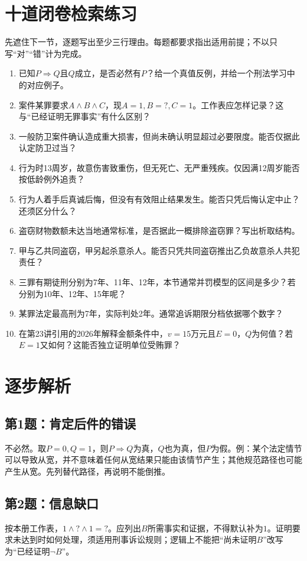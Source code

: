 \section{十道闭卷检索练习}
先遮住下一节，逐题写出至少三行理由。每题都要求指出适用前提；不以只写“对”“错”计为完成。
\begin{enumerate}
\item 已知$P\Rightarrow Q$且$Q$成立，是否必然有$P$？给一个真值反例，并给一个刑法学习中的对应例子。
\item 案件某罪要求$A\wedge B\wedge C$，现$A=1,B=?,C=1$。工作表应怎样记录？这与“已经证明无罪事实”有什么区别？
\item 一般防卫案件确认造成重大损害，但尚未确认明显超过必要限度。能否仅据此认定防卫过当？
\item 行为时13周岁，故意伤害致重伤，但无死亡、无严重残疾。仅因满12周岁能否按低龄例外追责？
\item 行为人着手后真诚后悔，但没有有效阻止结果发生。能否只凭后悔认定中止？还须区分什么？
\item 盗窃财物数额未达当地通常标准，是否据此一概排除盗窃罪？写出析取结构。
\item 甲与乙共同盗窃，甲另起杀意杀人。能否只凭共同盗窃推出乙负故意杀人共犯责任？
\item 三罪有期徒刑分别为7年、11年、12年，本节通常并罚模型的区间是多少？若分别为10年、12年、15年呢？
\item 某罪法定最高刑为7年，实际判处2年。通常追诉期限分档依据哪个数字？
\item 在第23讲引用的2026年解释金额条件中，$v=15$万元且$E=0$，$Q$为何值？若$E=1$又如何？这能否独立证明单位受贿罪？
\end{enumerate}

\section{逐步解析}
\subsection{第1题：肯定后件的错误}
不必然。取$P=0,Q=1$，则$P\Rightarrow Q$为真，$Q$也为真，但$P$为假。例：某个法定情节可以导致从宽，并不意味着任何从宽结果只能由该情节产生；其他规范路径也可能产生从宽。先列替代路径，再说明不能倒推。

\subsection{第2题：信息缺口}
按本册工作表，$1\wedge?\wedge1=?$。应列出$B$所需事实和证据，不得默认补为$1$。证明要求未达到时如何处理，须适用刑事诉讼规则；逻辑上不能把“尚未证明$B$”改写为“已经证明$\neg B$”。

